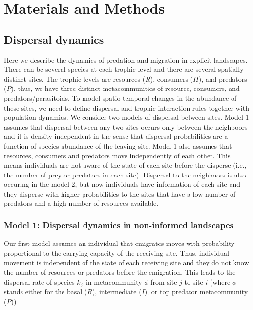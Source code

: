 \section{Materials and Methods}


\subsection{Dispersal dynamics}

Here we describe the dynamics of predation and migration in explicit
landscapes. There can be several species at each trophic level and
there are several spatially distinct sites. The trophic levels are
resources ($R$), consumers ($H$), and predators ($P$), thus, we have
three distinct metacommunities of resource, consumers, and
predators/parasitoids. To model spatio-temporal changes in the
abundance of these sites, we need to define dispersal and trophic
interaction rules together with population dynamics. We consider two
models of dispersal between sites. Model 1 assumes that dispersal
between any two sites occurs only between the neighboors and it is
density-independent in the sense that dispersal probabilities are a
function of species abundance of the leaving site. Model 1 also
assumes that resources, consumers and predators move independently of
each other. This means individuals are not aware of the state of each
site before the disperse (i.e., the number of prey or predators in
each site). Dispersal to the neighboors is also occuring in the model
2, but now individuals have information of each site and they disperse
with higher probabilities to the sites that have a low number of
predators and a high number of resources available.


\subsubsection{Model 1: Dispersal dynamics in non-informed landscapes}

Our first model assumes an individual that emigrates moves with
probability proportional to the carrying capacity of the receiving
site. Thus, individual movement is independent of the state of each
receiving site and they do not know the number of resources or
predators before the emigration. This leads to the dispersal rate of
species $k_{\mathcal{\phi}}$ in metacommunity $\mathcal{\phi}$ from
site $j$ to site $i$ (where $\mathcal{\phi}$ stands either for the
basal ($R$), intermediate ($I$), or top predator metacommunity ($P$))

